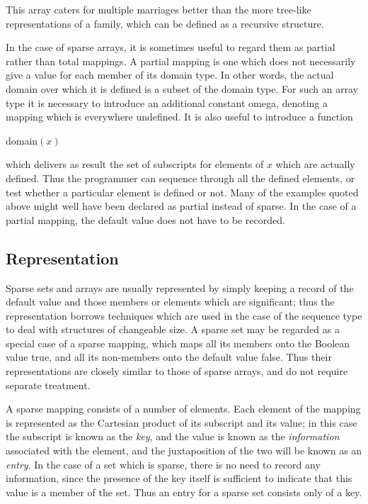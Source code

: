 \noindent
This array caters for multiple marriages better than the more tree-like representations of a family, which can be defined as a recursive structure.

In the case of sparse arrays, it is sometimes useful to regard them as partial rather than total mappings. A partial mapping is one which does not necessarily give a value for each member of its domain type. In other words, the actual domain over which it is defined is a subset of the domain type. For such an array type it is necessary to introduce an additional constant omega, denoting a mapping which is everywhere undefined. It is also useful to introduce a function

\quad domain$(x)$

\noindent
which delivers as result the set of subscripts for elements of $x$ which are actually defined. Thus the programmer can sequence through all the defined elements, or test whether a particular element is defined or not. Many of the examples quoted above might well have been declared as partial instead of sparse. In the case of a partial mapping, the default value does not have to be recorded.

\subsection{Representation}

\noindent
Sparse sets and arrays are usually represented by simply keeping a record of the default value and those members or elements which are significant; thus the representation borrows techniques which are used in the case of the sequence type to deal with structures of changeable size. A sparse set may be regarded as a special case of a sparse mapping, which maps all its members onto the Boolean value true, and all its non-members onto the default value false. Thus their representations are closely similar to those of sparse arrays, and do not require separate treatment.

A sparse mapping consists of a number of elements. Each element of the mapping is represented as the Cartesian product of its subscript and its value; in this case the subscript is known as the \textit{key}, and the value is known as the \textit{information} associated with the element, and the juxtaposition of the two will be known as an \textit{entry}. In the case of a set which is sparse, there is no need to record any information, since the presence of the key itself is sufficient to indicate that this value is a member of the set. Thus an entry for a sparse set consists only of a key.

